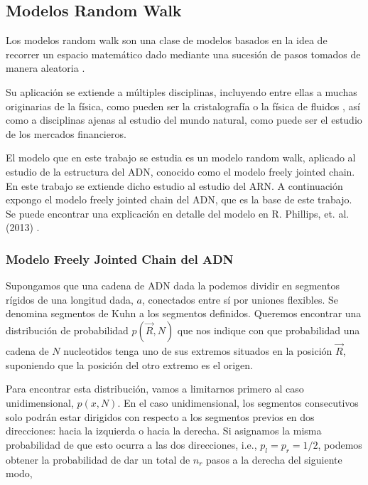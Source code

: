 \documentclass[a4paper,11pt,titlepage]{article}
\theoremstyle{definition}
\begin{document}
\subsection{Modelos Random Walk}\label{subsec:rndwalk}

Los modelos random walk son una clase de modelos basados en la idea de recorrer un espacio matemático dado mediante una sucesión de pasos tomados de manera aleatoria \cite{doyle} \cite{pearson}.

Su aplicación se extiende a múltiples disciplinas, incluyendo entre ellas a muchas originarias de la física, como pueden ser la cristalografía o la física de fluidos \cite{weiss}, así como a disciplinas ajenas al estudio del mundo natural, como puede ser el estudio de los mercados financieros\cite{blsch}.

El modelo que en este trabajo se estudia es un modelo random walk, aplicado al estudio de la estructura del ADN, conocido como el modelo freely jointed chain. En este trabajo se extiende dicho estudio al estudio del ARN. A continuación expongo el modelo freely jointed chain del ADN, que es la base de este trabajo. Se puede encontrar una explicación en detalle del modelo en R. Phillips, et. al. (2013) \cite{phillips}.

\subsubsection{Modelo Freely Jointed Chain del ADN}\label{subsubsec:rndpoly} %

Supongamos que una cadena de ADN dada la podemos dividir en segmentos rígidos de una longitud dada, $a$, conectados entre sí por uniones flexibles. Se denomina segmentos de Kuhn a los segmentos definidos. Queremos encontrar una distribución de probabilidad $p(\vec{R}, N)$ que nos indique con que probabilidad una cadena de $N$ nucleotidos tenga uno de sus extremos situados en la posición $\vec{R}$, suponiendo que la posición del otro extremo es el origen.

Para encontrar esta distribución, vamos a limitarnos primero al caso unidimensional, $p(x, N)$. En el caso unidimensional, los segmentos consecutivos solo podrán estar dirigidos con respecto a los segmentos previos en dos direcciones: hacia la izquierda o hacia la derecha. Si asignamos la misma probabilidad de que esto ocurra a las dos direcciones, i.e., $p_l = p_r = 1/2$, podemos obtener la probabilidad de dar un total de $n_r$ pasos a la derecha del siguiente modo,
\end{document}
